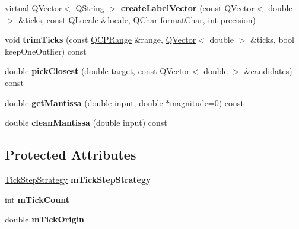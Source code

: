\begin{DoxyCompactItemize}
\item 
virtual \hyperlink{class_q_vector}{Q\+Vector}$<$ Q\+String $>$ {\bfseries create\+Label\+Vector} (const \hyperlink{class_q_vector}{Q\+Vector}$<$ double $>$ \&ticks, const Q\+Locale \&locale, Q\+Char format\+Char, int precision)\hypertarget{class_q_c_p_axis_ticker_ab1ec5c1c6dad57320d64ceef837b439c}{}\label{class_q_c_p_axis_ticker_ab1ec5c1c6dad57320d64ceef837b439c}

\item 
void {\bfseries trim\+Ticks} (const \hyperlink{class_q_c_p_range}{Q\+C\+P\+Range} \&range, \hyperlink{class_q_vector}{Q\+Vector}$<$ double $>$ \&ticks, bool keep\+One\+Outlier) const \hypertarget{class_q_c_p_axis_ticker_a7eaaf1a0bf7807fe95e36d40e3b3ed65}{}\label{class_q_c_p_axis_ticker_a7eaaf1a0bf7807fe95e36d40e3b3ed65}

\item 
double {\bfseries pick\+Closest} (double target, const \hyperlink{class_q_vector}{Q\+Vector}$<$ double $>$ \&candidates) const \hypertarget{class_q_c_p_axis_ticker_ae967cfb82e329d834a50c6f1f0d2a33d}{}\label{class_q_c_p_axis_ticker_ae967cfb82e329d834a50c6f1f0d2a33d}

\item 
double {\bfseries get\+Mantissa} (double input, double $\ast$magnitude=0) const \hypertarget{class_q_c_p_axis_ticker_a791ecd8c1a9c000f8e7fdb2578aca257}{}\label{class_q_c_p_axis_ticker_a791ecd8c1a9c000f8e7fdb2578aca257}

\item 
double {\bfseries clean\+Mantissa} (double input) const \hypertarget{class_q_c_p_axis_ticker_a534f5a2c9f8565c602a5423e944c7747}{}\label{class_q_c_p_axis_ticker_a534f5a2c9f8565c602a5423e944c7747}

\end{DoxyCompactItemize}
\subsection*{Protected Attributes}
\begin{DoxyCompactItemize}
\item 
\hyperlink{class_q_c_p_axis_ticker_ab6d2f9d9477821623ac9bc4b21ddf49a}{Tick\+Step\+Strategy} {\bfseries m\+Tick\+Step\+Strategy}\hypertarget{class_q_c_p_axis_ticker_ac059d6d670b2f6132c593fb4de156701}{}\label{class_q_c_p_axis_ticker_ac059d6d670b2f6132c593fb4de156701}

\item 
int {\bfseries m\+Tick\+Count}\hypertarget{class_q_c_p_axis_ticker_a14a35b47d1aad11b08d18ea0e25937b8}{}\label{class_q_c_p_axis_ticker_a14a35b47d1aad11b08d18ea0e25937b8}

\item 
double {\bfseries m\+Tick\+Origin}\hypertarget{class_q_c_p_axis_ticker_a560ef9347b1aa599a9bf0e2f29d3ec16}{}\label{class_q_c_p_axis_ticker_a560ef9347b1aa599a9bf0e2f29d3ec16}

\end{DoxyCompactItemize}


